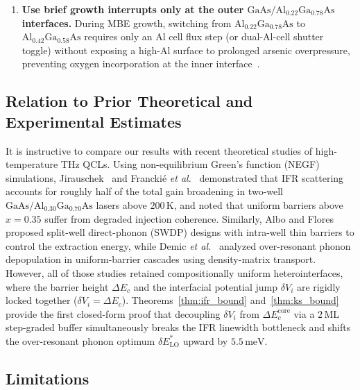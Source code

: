\documentclass[11pt,letterpaper]{article}
\begin{document}
\begin{enumerate}
    \item \textbf{Use brief growth interrupts only at the outer $\mathrm{GaAs}/\mathrm{Al}_{0.22}\mathrm{Ga}_{0.78}\mathrm{As}$ interfaces.} During MBE growth, switching from $\mathrm{Al}_{0.22}\mathrm{Ga}_{0.78}\mathrm{As}$ to $\mathrm{Al}_{0.42}\mathrm{Ga}_{0.58}\mathrm{As}$ requires only an $\mathrm{Al}$ cell flux step (or dual-$\mathrm{Al}$-cell shutter toggle) without exposing a high-$\mathrm{Al}$ surface to prolonged arsenic overpressure, preventing oxygen incorporation at the inner interface~\cite{LiLinfieldRoadmap2025}.
\end{enumerate}

\subsection{Relation to Prior Theoretical and Experimental Estimates}
\label{subsec:prior_work}

It is instructive to compare our results with recent theoretical studies of high-temperature THz QCLs. Using non-equilibrium Green's function (NEGF) simulations, Jirauschek~\cite{JirauschekRoadmap2025} and Francki\'e \textit{et al.}~\cite{Francki2019} demonstrated that IFR scattering accounts for roughly half of the total gain broadening in two-well $\mathrm{GaAs}/\mathrm{Al}_{0.30}\mathrm{Ga}_{0.70}\mathrm{As}$ lasers above $200\,\mathrm{K}$, and noted that uniform barriers above $x = 0.35$ suffer from degraded injection coherence. Similarly, Albo and Flores~\cite{Albo2015,Albo2019} proposed split-well direct-phonon (SWDP) designs with intra-well thin barriers to control the extraction energy, while Demic \textit{et al.}~\cite{DemicRoadmap2025} analyzed over-resonant phonon depopulation in uniform-barrier cascades using density-matrix transport. However, all of those studies retained compositionally uniform heterointerfaces, where the barrier height $\Delta E_c$ and the interfacial potential jump $\delta V_i$ are rigidly locked together ($\delta V_i = \Delta E_c$). Theorems~\ref{thm:ifr_bound} and~\ref{thm:ks_bound} provide the first closed-form proof that decoupling $\delta V_i$ from $\Delta E_c^{\mathrm{core}}$ via a $2\,\mathrm{ML}$ step-graded buffer simultaneously breaks the IFR linewidth bottleneck and shifts the over-resonant phonon optimum $\delta E_{\mathrm{LO}}^*$ upward by $5.5\,\mathrm{meV}$.

\subsection{Limitations}
\label{subsec:limitations}
\end{document}

